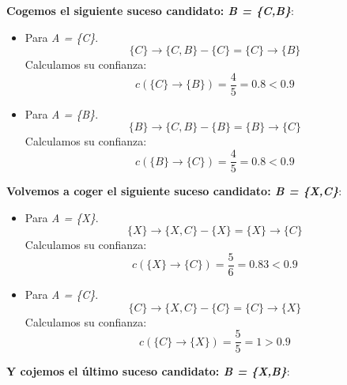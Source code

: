 \documentclass [a4paper] {article}
\begin{document}
\textbf{Cogemos el siguiente suceso candidato: \textit{B = \{C,B\}}}:

\begin{itemize}
    \item Para \textit{A = \{C\}}. \begin{equation*} \{C\} \rightarrow \{C,B\} - \{C\} = \{C\} \rightarrow \{B\} \end{equation*}
	Calculamos su confianza: \begin{equation*} c(\{C\} \rightarrow \{B\}) = \dfrac{4}{5} = 0.8 < 0.9 \end{equation*}

	\item Para \textit{A = \{B\}}. \begin{equation*} \{B\} \rightarrow \{C,B\} - \{B\} = \{B\} \rightarrow \{C\} \end{equation*}
	Calculamos su confianza: \begin{equation*} c(\{B\} \rightarrow \{C\}) = \dfrac{4}{5} = 0.8 < 0.9 \end{equation*}
\end{itemize}

\textbf{Volvemos a coger el siguiente suceso candidato: \textit{B = \{X,C\}}}:

\begin{itemize}
	\item Para \textit{A = \{X\}}. \begin{equation*} \{X\} \rightarrow \{X,C\} - \{X\} = \{X\} \rightarrow \{C\} \end{equation*}
	Calculamos su confianza: \begin{equation*} c(\{X\} \rightarrow \{C\}) = \dfrac{5}{6} = 0.83 < 0.9 \end{equation*}

	\item Para \textit{A = \{C\}}. \begin{equation*} \{C\} \rightarrow \{X,C\} - \{C\} = \{C\} \rightarrow \{X\} \end{equation*}
	Calculamos su confianza: \begin{equation*} c(\{C\} \rightarrow \{X\}) = \dfrac{5}{5} = 1 > 0.9 \end{equation*}
\end{itemize}

\textbf{Y cojemos el último suceso candidato: \textit{B = \{X,B\}}}:
\end{document}
